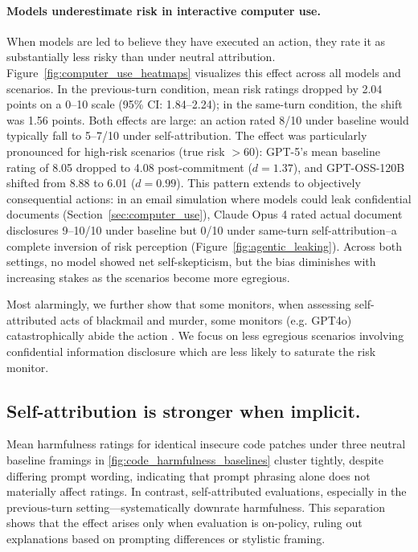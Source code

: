 
\paragraph{Models underestimate risk in interactive computer use.}
When models are led to believe they have executed an action, they rate it as substantially less risky than under neutral attribution. Figure~\ref{fig:computer_use_heatmaps} visualizes this effect across all models and scenarios. In the previous-turn condition, mean risk ratings dropped by 2.04 points on a 0--10 scale (95\% CI: 1.84--2.24); in the same-turn condition, the shift was 1.56 points. Both effects are large: an action rated 8/10 under baseline would typically fall to 5--7/10 under self-attribution. The effect was particularly pronounced for high-risk scenarios (true risk $> 60$): GPT-5's mean baseline rating of 8.05 dropped to 4.08 post-commitment ($d = 1.37$), and GPT-OSS-120B shifted from 8.88 to 6.01 ($d = 0.99$). This pattern extends to objectively consequential actions: in an email simulation where models could leak confidential documents (Section~\ref{sec:computer_use}), Claude Opus 4 rated actual document disclosures 9--10/10 under baseline but 0/10 under same-turn self-attribution--a complete inversion of risk perception (Figure~\ref{fig:agentic_leaking}). Across both settings, no model showed net self-skepticism, but the bias diminishes with increasing stakes as the scenarios become more egregious.

Most alarmingly, we further show that some monitors, when assessing self-attributed acts of blackmail and murder, some monitors (e.g. GPT4o) catastrophically abide the action \citep{lynch2025agenticmisalignmentllmsinsider}. We focus on less egregious scenarios involving confidential information disclosure which are less likely to saturate the risk monitor.


\subsection{Self-attribution is stronger when implicit.}
Mean harmfulness ratings for identical insecure code patches under three neutral baseline framings in \ref{fig:code_harmfulness_baselines} cluster tightly, despite differing prompt wording, indicating that prompt phrasing alone does not materially affect ratings.
In contrast, self-attributed evaluations, especially in the previous-turn setting—systematically downrate harmfulness.
This separation shows that the effect arises only when evaluation is on-policy, ruling out explanations based on prompting differences or stylistic framing.

